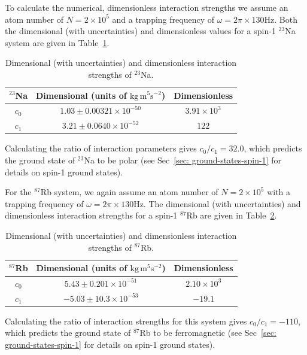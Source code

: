 To calculate the numerical, dimensionless interaction strengths we assume an
atom number of \(N = 2\times10^5\) and a trapping frequency of
\(\omega = 2\pi \times 130\)Hz.
Both the dimensional (with uncertainties) and dimensionless values for a spin-1
\( ^{23}\)Na system are given in Table~\ref{table: spin-1-interactions-sodium}.
\begin{table}
    \centering
    \begin{tabular}{ccc}
        \toprule
        \( ^{23}\)Na & Dimensional (units of \(\text{kg}\, \text{m}^5
        \text{s}^{-2}\)) & Dimensionless \\
        \midrule
        \(c_0\) & \(1.03 \pm 0.00321 \times 10^{-50}\) & \(3.91\times10^3\) \\
        \(c_1\) & \(3.21 \pm 0.0640 \times 10^{-52}\) & \(122\) \\
        \bottomrule
    \end{tabular}
    \caption{\label{table: spin-1-interactions-sodium}Dimensional (with
    uncertainties) and dimensionless interaction strengths of \( ^{23}\)Na.}
\end{table}
Calculating the ratio of interaction parameters gives \(c_0/c_1=32.0 \),
which predicts the ground state of \( ^{23}\)Na to be polar (see
Sec~\ref{sec: ground-states-spin-1} for details on spin-1 ground states).

For the \( ^{87}\)Rb system, we again assume an atom number of
\(N = 2\times 10^5\) with a trapping frequency of
\(\omega = 2\pi \times 130\)Hz.
The dimensional (with uncertainties) and dimensionless interaction strengths
for a spin-1 \( ^{87}\)Rb are given in
Table~\ref{table: spin-1-interactions-rb87}.
\begin{table}
    \centering
    \begin{tabular}{ccc}
        \toprule
        \( ^{87}\)Rb & Dimensional (units of \(\text{kg}\, \text{m}^5
        \text{s}^{-2}\)) & Dimensionless \\
        \midrule
        \(c_0\) & \(5.43 \pm 0.201 \times 10^{-51}\) & \(2.10\times10^3\) \\
        \(c_1\) & \(-5.03 \pm 10.3 \times 10^{-53}\) & \(-19.1\) \\
        \bottomrule
    \end{tabular}
    \caption{\label{table: spin-1-interactions-rb87}Dimensional (with
    uncertainties) and dimensionless interaction strengths of \( ^{87}\)Rb.}
\end{table}
Calculating the ratio of interaction strengths for this system gives
\(c_0/c_1=-110 \), which predicts the ground state of \( ^{87}\)Rb to be
ferromagnetic (see
Sec~\ref{sec: ground-states-spin-1} for details on spin-1 ground states).

